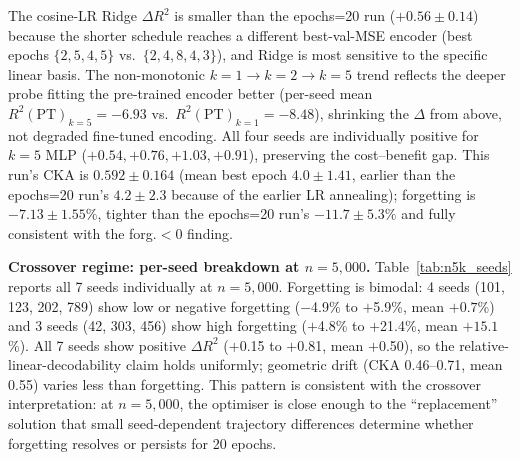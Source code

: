The cosine-LR Ridge $\Delta R^2$ is smaller than the epochs=20 run
($+0.56{\pm}0.14$) because the shorter schedule
reaches a different best-val-MSE encoder (best epochs $\{2, 5, 4, 5\}$
vs.\ $\{2, 4, 8, 4, 3\}$), and Ridge is most sensitive to the
specific linear basis.  The non-monotonic $k{=}1 \to k{=}2 \to k{=}5$
trend reflects the deeper probe fitting the pre-trained encoder
better (per-seed mean $R^2(\text{PT})_{k{=}5}{=}-6.93$ vs.\
$R^2(\text{PT})_{k{=}1}{=}-8.48$), shrinking the $\Delta$ from
above, not degraded fine-tuned encoding.  All four seeds
are individually positive for $k{=}5$ MLP
($+0.54, +0.76, +1.03, +0.91$), preserving the cost--benefit gap.
This run's CKA is $0.592{\pm}0.164$ (mean best epoch
$4.0{\pm}1.41$, earlier than the epochs=20 run's $4.2{\pm}2.3$ because of the
earlier LR annealing);
forgetting is $-7.13{\pm}1.55\%$, tighter than the epochs=20 run's
$-11.7{\pm}5.3\%$ and fully consistent with the forg.$<0$ finding.

\textbf{Crossover regime: per-seed breakdown at $n{=}5{,}000$.}
Table~\ref{tab:n5k_seeds} reports all 7 seeds individually at
$n{=}5{,}000$.  Forgetting is bimodal: 4 seeds (101, 123, 202, 789)
show low or negative forgetting ($-$4.9\% to $+$5.9\%, mean $+0.7$\%)
and 3 seeds (42, 303, 456) show high forgetting ($+$4.8\% to $+$21.4\%,
mean $+15.1$\%).
All 7 seeds show positive $\Delta R^2$ ($+$0.15 to $+$0.81, mean $+$0.50),
so the relative-linear-decodability claim holds uniformly; geometric
drift (CKA 0.46--0.71, mean 0.55) varies less than forgetting.
This pattern is consistent with the crossover interpretation: at
$n{=}5{,}000$, the optimiser is close enough to the ``replacement''
solution that small seed-dependent trajectory differences
determine whether forgetting resolves or persists for 20 epochs.

